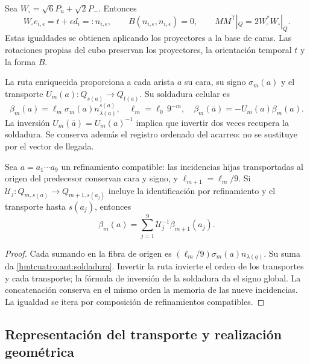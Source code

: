 Sea \(W_\square=\sqrt6P_u+\sqrt2P_-\). Entonces
\[
 W_\square e_{i,\epsilon}=t+\epsilon d_i=:n_{i,\epsilon},
 \qquad B(n_{i,\epsilon},n_{i,\epsilon})=0,\qquad
 MM^{\mathsf T}|_Q=2W_\square^*W_\square|_Q .
\]
Estas igualdades se obtienen aplicando los proyectores a la base de
caras. Las rotaciones propias del cubo preservan los proyectores,
la orientación temporal \(t\) y la forma \(B\).

La ruta enriquecida proporciona a cada arista \(a\) su cara,
su signo \(\sigma_m(a)\) y el transporte
\(U_m(a):Q_{s(a)}\to Q_{t(a)}\). Su soldadura celular es
\begin{equation}
 \beta_m(a)=\ell_m\sigma_m(a)n_{\lambda(\underline a)}^{s(a)},
 \quad \ell_m=\ell_0\,9^{-m},\quad
 \beta_m(\bar a)=-U_m(a)\beta_m(a).
 \label{hmtcuatro:ant:soldadura}
\end{equation}
La inversión \(U_m(\bar a)=U_m(a)^{-1}\) implica que invertir dos
veces recupera la soldadura. Se conserva además el registro ordenado
del acarreo: no se sustituye por el vector de llegada.

\begin{proposition}
\label{hmtcuatro:ant:refinamiento-soldadura}
Sea \(a=a_1\cdots a_9\) un refinamiento compatible: las incidencias
hijas transportadas al origen del predecesor conservan cara y signo,
y \(\ell_{m+1}=\ell_m/9\). Si
\(\mathcal U_j:Q_{m,s(a)}\to Q_{m+1,s(a_j)}\) incluye la
identificación por refinamiento y el transporte hasta \(s(a_j)\),
entonces
\[
 \beta_m(a)=\sum_{j=1}^9\mathcal U_j^{-1}\beta_{m+1}(a_j).
\]
\end{proposition}
\begin{proof}
Cada sumando en la fibra de origen es
\((\ell_m/9)\sigma_m(a)n_{\lambda(\underline a)}\). Su suma da
\eqref{hmtcuatro:ant:soldadura}. Invertir la ruta invierte el orden
de los transportes y cada transporte; la fórmula de inversión de
la soldadura da el signo global. La concatenación conserva en el
mismo orden la memoria de las nueve incidencias. La igualdad se
itera por composición de refinamientos compatibles.
\end{proof}

\subsection{Representación del transporte y realización geométrica}
\label{hmtcuatro:ant:geometria}

